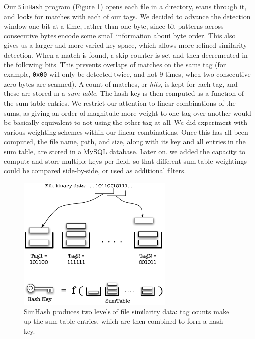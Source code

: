 \documentclass[10pt, twocolumn]{article}
\begin{document}
Our {\tt SimHash} program (Figure \ref{simHash}) opens each file in a directory, scans through it, and looks for matches with each of our tags.  We decided to advance the detection window one bit at a time, rather than one byte, since bit patterns across consecutive bytes encode some small information about byte order.  This also gives us a larger and more varied key space, which allows more refined similarity detection.  When a match is found, a skip counter is set and then decremented in the following bits.  This prevents overlaps of matches on the same tag (for example, {\tt 0x00} will only be detected twice, and not 9 times, when two consecutive zero bytes are scanned).  A count of matches, or {\it hits}, is kept for each tag, and these are stored in a {\it sum table}.  The hash key is then computed as a function of the sum table entries.  We restrict our attention to linear combinations of the sums, as giving an order of magnitude more weight to one tag over another would be basically equivalent to not using the other tag at all.  We did experiment with various weighting schemes within our linear combinations.  Once this has all been computed, the file name, path, and size, along with its key and all entries in the sum table, are stored in  a MySQL database.  Later on, we added the capacity to compute and store multiple keys per field, so that different sum table weightings could be compared side-by-side, or used as additional filters.

 \begin{figure}[t] 
 \centering
\includegraphics[width= 3in]{simHashInternals.pdf}
\caption{SimHash produces two levels of file similarity data: tag counts make up the sum table entries, which are then combined to form a hash key.}
\label{simHash} 
\end{figure}   
\end{document}
